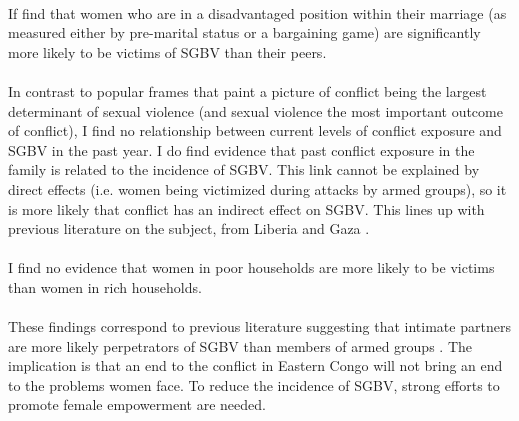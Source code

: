 \documentclass[10pt,a4paper]{scrartcl} %
\begin{document}
\paragraph{} 
If find that women who are in a disadvantaged position within their marriage (as measured either by pre-marital status or a bargaining game) are significantly more likely to be victims of SGBV than their peers.

\paragraph{} 
In contrast to popular frames that paint a picture of conflict being the largest determinant of sexual violence (and sexual violence the most important outcome of conflict), I find no relationship between current levels of conflict exposure and SGBV in the past year. I do find evidence that past conflict exposure in the family is related to the incidence of SGBV. This link cannot be explained by direct effects (i.e. women being victimized during attacks by armed groups), so it is more likely that conflict has an indirect effect on SGBV. This lines up with previous literature on the subject, from Liberia and Gaza \cite{Muller2019,Kelly2018}.

\paragraph{} 
I find no evidence that women in poor households are more likely to be victims than women in rich households.

\paragraph{} 
These findings correspond to previous literature suggesting that intimate partners are more likely perpetrators of SGBV than members of armed groups \citep[see e.g.][]{Peterman2011}. The implication is that an end to the conflict in Eastern Congo will not bring an end to the problems women face. To reduce the incidence of SGBV, strong efforts to promote female empowerment are needed.








\clearpage 


\end{document}
